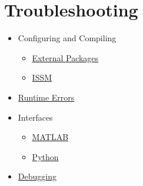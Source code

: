 
\section{Troubleshooting}
\begin{itemize}
\item Configuring and Compiling
\begin{itemize}
\item \hyperref[sec:troubleshooting-compiling-externalpackages]{External Packages}
\item \hyperref[sec:troubleshooting-compiling-issm]{ISSM}
\end{itemize}
\item \hyperref[sec:troubleshooting-runtime]{Runtime Errors}
\item Interfaces
\begin{itemize}
\item \hyperref[sec:troubleshooting-interfaces-matlab]{MATLAB}
\item \hyperref[sec:troubleshooting-interfaces-python]{Python}
\end{itemize}
\item \hyperref[sec:troubleshooting-debugging]{Debugging}
\end{itemize}

\clearpage %

